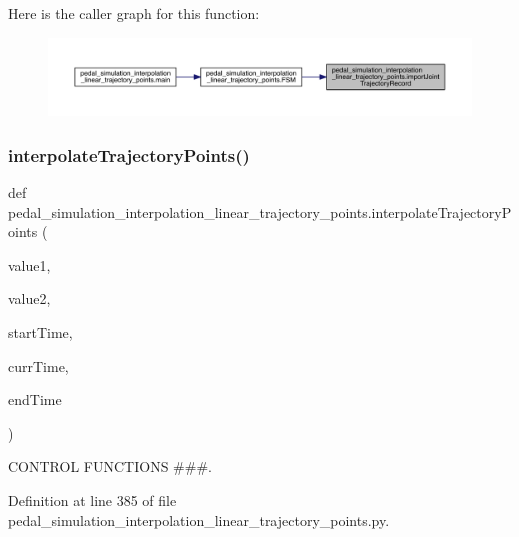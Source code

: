Here is the caller graph for this function\+:\nopagebreak
\begin{figure}[H]
\begin{center}
\leavevmode
\includegraphics[width=350pt]{namespacepedal__simulation__interpolation__linear__trajectory__points_afa0031bbb7e988157c3978c77909c9f3_icgraph}
\end{center}
\end{figure}
\mbox{\label{namespacepedal__simulation__interpolation__linear__trajectory__points_a566b961b7c78e9a10e7bc0cca3e0c184}} 
\subsubsection{\texorpdfstring{interpolateTrajectoryPoints()}{interpolateTrajectoryPoints()}}
{\footnotesize\ttfamily def pedal\+\_\+simulation\+\_\+interpolation\+\_\+linear\+\_\+trajectory\+\_\+points.\+interpolate\+Trajectory\+Points (\begin{DoxyParamCaption}\item[{}]{value1,  }\item[{}]{value2,  }\item[{}]{start\+Time,  }\item[{}]{curr\+Time,  }\item[{}]{end\+Time }\end{DoxyParamCaption})}



C\+O\+N\+T\+R\+OL F\+U\+N\+C\+T\+I\+O\+NS \#\#\#. 



Definition at line 385 of file pedal\+\_\+simulation\+\_\+interpolation\+\_\+linear\+\_\+trajectory\+\_\+points.\+py.


